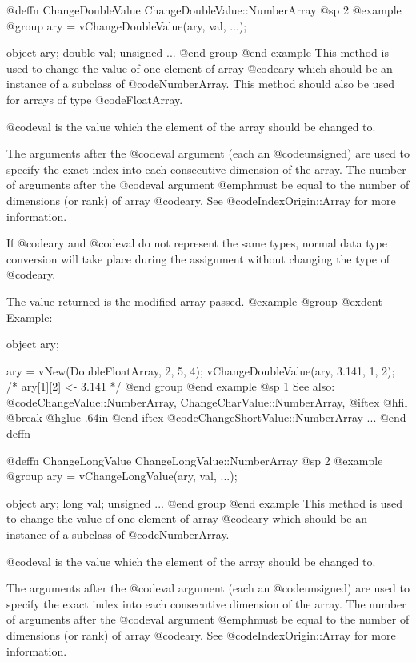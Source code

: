 @deffn {ChangeDoubleValue} ChangeDoubleValue::NumberArray
@sp 2
@example
@group
ary = vChangeDoubleValue(ary, val, ...);

object    ary;
double    val;
unsigned  ...
@end group
@end example
This method is used to change the value of one element of
array @code{ary} which should be an instance of a subclass of
@code{NumberArray}.  This method should also be used for
arrays of type @code{FloatArray}.

@code{val} is the value which the element of the array should be changed
to.  

The arguments after the @code{val} argument (each an @code{unsigned})
are used to specify the exact index into each consecutive dimension of
the array.  The number of arguments after the @code{val} argument
@emph{must} be equal to the number of dimensions (or rank) of array
@code{ary}.  See @code{IndexOrigin::Array} for more information.

If @code{ary} and @code{val} do not represent the same types, normal
data type conversion will take place during the assignment without
changing the type of @code{ary}.

The value returned is the modified array passed.
@example
@group
@exdent Example:

object  ary;

ary = vNew(DoubleFloatArray, 2, 5, 4);
vChangeDoubleValue(ary, 3.141, 1, 2);
/*  ary[1][2] <- 3.141  */
@end group
@end example
@sp 1
See also:  @code{ChangeValue::NumberArray, ChangeCharValue::NumberArray,}
@iftex
@hfil @break @hglue .64in 
@end iftex
@code{ChangeShortValue::NumberArray}  ...
@end deffn









@deffn {ChangeLongValue} ChangeLongValue::NumberArray
@sp 2
@example
@group
ary = vChangeLongValue(ary, val, ...);

object    ary;
long      val;
unsigned  ...
@end group
@end example
This method is used to change the value of one element of
array @code{ary} which should be an instance of a subclass of
@code{NumberArray}.

@code{val} is the value which the element of the array should be changed
to.  

The arguments after the @code{val} argument (each an @code{unsigned})
are used to specify the exact index into each consecutive dimension of
the array.  The number of arguments after the @code{val} argument
@emph{must} be equal to the number of dimensions (or rank) of array
@code{ary}.  See @code{IndexOrigin::Array} for more information.

